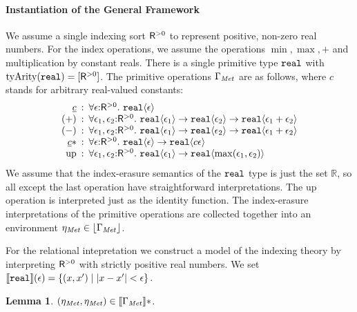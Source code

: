\documentclass{sigplanconf}
\newcommand{\abs}[1]{\lvert #1 \rvert}
\newcommand{\sepbar}{\mathrel|}
\newcommand{\tyPrim}[2]{\textup{\texttt{#1}}\langle #2 \rangle}
\newcommand{\tyPrimNm}[1]{\textup{\texttt{#1}}}
\newcommand{\primTyArity}{\mathrm{tyArity}}
\newcommand{\ctxtSem}[1]{\left\lfloor #1 \right\rfloor}
\newcommand{\rsem}[1]{\llbracket #1 \rrbracket}
\newtheorem{lemma}{Lemma}
\theoremstyle{examplestyle}
\theoremstyle{restatementstyle}
\begin{document}
\paragraph{Instantiation of the General Framework}
We assume a single indexing sort $\mathsf{R}^{>0}$ %
to represent positive, non-zero real numbers. For the index
operations, we assume the operations $\min, \max, +$ and
multiplication by constant reals. There is a single primitive type
$\tyPrimNm{real}$ with $\primTyArity(\tyPrimNm{real}) =
[\metricSort]$. The primitive operations $\Gamma_{\mathit{Met}}$ are as
follows, where $c$ stands for arbitrary real-valued constants:
\begin{displaymath}
  \begin{array}{r@{\hspace{0.5em}:\hspace{0.5em}}l}
    \underline{c} & \forall \epsilon\mathord:\metricSort.\ \tyPrim{real}{\epsilon} \\
    (+) & \forall \epsilon_1, \epsilon_2\mathord:\metricSort.\ \tyPrim{real}{\epsilon_1} \to \tyPrim{real}{\epsilon_2} \to \tyPrim{real}{\epsilon_1 + \epsilon_2} \\
    (-) & \forall \epsilon_1, \epsilon_2\mathord:\metricSort.\ \tyPrim{real}{\epsilon_1} \to \tyPrim{real}{\epsilon_2} \to \tyPrim{real}{\epsilon_1 + \epsilon_2} \\
    \underline{c} * & \forall \epsilon\mathord:\metricSort.\ \tyPrim{real}{\epsilon} \to \tyPrim{real}{c\epsilon} \\
    \mathrm{up} & \forall \epsilon_1,\epsilon_2\mathord:\metricSort.\ \tyPrim{real}{\epsilon_1} \to \tyPrim{real}{\max(\epsilon_1,\epsilon_2)}
  \end{array}
\end{displaymath}
We assume that the index-erasure semantics of the $\tyPrimNm{real}$
type is just the set $\mathbb{R}$, so all except the last operation
have straightforward interpretations. The $\mathrm{up}$ operation is
interpreted just as the identity function. The index-erasure
interpretations of the primitive operations are collected together
into an environment $\eta_\Metric \in \ctxtSem{\Gamma_\Metric}$.

For the relational intepretation we construct a model of the indexing
theory by interpreting $\mathsf{R}^{>0}$ with strictly positive real
numbers. We set $\rsem{\tyPrimNm{real}}(\epsilon) = \{ (x,x') \sepbar
\abs{x - x'} < \epsilon \}$.
\begin{lemma}\label{lem:metric-environments}
  $(\eta_\Metric, \eta_\Metric) \in \rsem{\Gamma_\Metric}{}*$.
\end{lemma}
\end{document}
